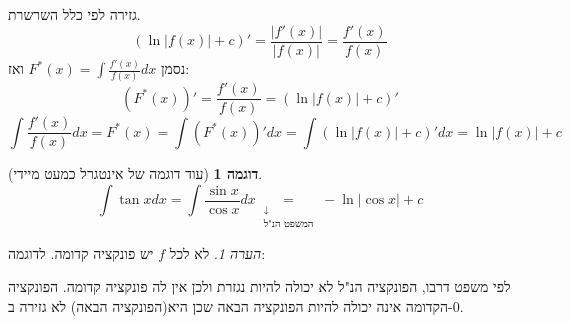 \documentclass[12pt]{article}
\makeatletter
\let\oldint\int
\renewcommand{\int}{\oldint\limits}
\theoremstyle{plain}
\theoremstyle{definition}
\newtheorem{example}[theorem]{דוגמה}      %
\theoremstyle{remark}
\newtheorem*{remark}{הערה}                %
\renewenvironment{proof}[1][\proofname]{\par
  \pushQED{\qed}%
  \normalfont \topsep6\p@\@plus6\p@\relax
  \trivlist
  \item[\hskip\labelsep\itshape #1\@addpunct{.}]\par\ignorespaces
}{%
  \popQED\endtrivlist\@endpefalse
}
\renewcommand{\qed}{\par\nobreak\hfill\qedsymbol\par}
\renewcommand{\proofname}{הוכחה}          %
\makeatother
\begin{document}
\begin{proof}
גזירה לפי כלל השרשרת.\[
{(\ln |f(x)|+c)'=\frac{|f'(x)|}{|f(x)|}=\frac{f'(x)}{f(x)}}
\]
נסמן \({\displaystyle F^*(x)=\int \frac{f'(x)}{f(x)}dx}\) ואז:\[
{(F^*(x))'=\frac{f'(x)}{f(x)}=(\ln |f(x)|+c)'}
\]
\[
{\int \frac{f'(x)}{f(x)}dx=F^*(x)=\int (F^*(x))'dx=\int (\ln |f(x)|+c)'dx=\ln |f(x)|+c}
\]

\end{proof}
\begin{example}[עוד דוגמה של אינטגרל כמעט מיידי]
\[
{\int \tan xdx=\int \frac{\sin x}{\cos x}dx \underset{\begin{matrix}
\downarrow \\
{\text{המשפט הנ"ל}}
\end{matrix}}{=}-\ln |\cos x|+c}
\]

\end{example}
\begin{remark}
לא לכל \({f}\) יש פונקציה קדומה. לדוגמה:\begin{LTR}
\begin{center}
\end{center}
\end{LTR}
לפי משפט דרבו, הפונקציה הנ"ל לא יכולה להיות נגזרת ולכן אין לה פונקציה קדומה.\newline{}
הפונקציה הקדומה אינה יכולה להיות הפונקציה הבאה שכן היא(הפונקציה הבאה) לא גזירה ב-\({0}\).\begin{LTR}
\begin{center}
\end{center}
\end{LTR}

\end{remark}
\end{document}
